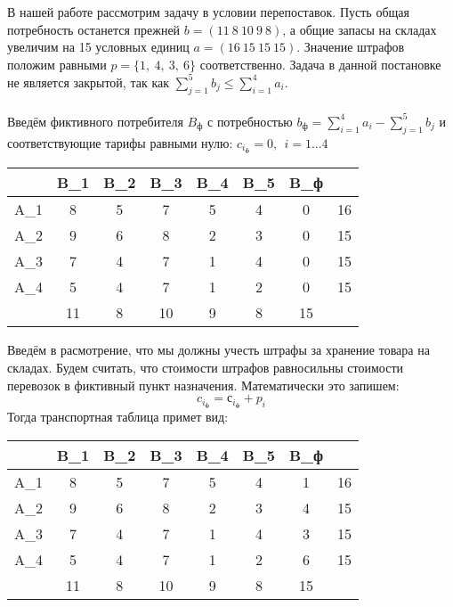 \documentclass{article}
\begin{document}
\noindent В нашей работе рассмотрим задачу в условии перепоставок. Пусть общая потребность останется прежней $b = (11~8~10~9~8)$,  а общие запасы на складах увеличим на 15 условных единиц $a = (16~15~15~15)$. Значение штрафов положим равными $p = \{1,~4,~3,~6\}$ соответственно.
Задача в данной постановке не является закрытой, так как $\displaystyle\sum_{j=1}^{5} b_{j}  \le \displaystyle\sum_{i=1}^{4} a_{i}$.
\\\\
Введём фиктивного потребителя $B_ф$ с потребностью $b_ф= \sum_{i=1}^{4} a_{i}-\sum_{j=1}^{5} b_{j}$ и соответствующие тарифы равными нулю: $c_i_ф=0,~~i=1...4$
\begin{table}[H]
    \centering
    \begin{tabular}{|c|c|c|c|c|c|c| |c|}
    \hline
        &\cellcolor{myGren} B_1 & \cellcolor{myGren}B_2 & \cellcolor{myGren}B_3 & \cellcolor{myGren}B_4 & \cellcolor{myGren} B_5 & \cellcolor{myGren} B_ф &  \\ \hline
       \cellcolor{myGren} A_1 & 8 & 5 & 7 & 5 & 4 & 0 & 16\\ \hline
       \cellcolor{myGren} A_2 & 9 & 6 & 8 & 2 & 3 & 0 & 15\\  \hline
       \cellcolor{myGren} A_3 & 7 & 4 & 7 & 1 & 4 & 0 & 15\\ \hline
       \cellcolor{myGren} A_4 & 5 & 4 & 7 & 1 & 2 & 0& 15\\ \hline\hline
            & 11 & 8 & 10 & 9 & 8 & 15 & \\
            \hline
    \end{tabular}
 \end{table}
 
\noindent Введём в расмотрение, что мы должны учесть штрафы за хранение товара на складах. Будем считать, что стоимости штрафов равносильны стоимости перевозок в фиктивный пункт назначения.
Математически это запишем: 
$$c_i_ф = с_i_ф + p_i$$
Тогда транспортная таблица примет вид: 
\begin{table}[H]
    \centering
    \begin{tabular}{|c|c|c|c|c|c|c| |c|}
    \hline
        &\cellcolor{myGren} B_1 & \cellcolor{myGren}B_2 & \cellcolor{myGren}B_3 & \cellcolor{myGren}B_4 & \cellcolor{myGren} B_5 & \cellcolor{myGren} B_ф &  \\ \hline
       \cellcolor{myGren} A_1 & 8 & 5 & 7 & 5 & 4 & 1 & 16\\ \hline
       \cellcolor{myGren} A_2 & 9 & 6 & 8 & 2 & 3 & 4 & 15\\  \hline
       \cellcolor{myGren} A_3 & 7 & 4 & 7 & 1 & 4 & 3 & 15\\ \hline
       \cellcolor{myGren} A_4 & 5 & 4 & 7 & 1 & 2 & 6& 15\\ \hline\hline
            & 11 & 8 & 10 & 9 & 8 & 15 & \\
            \hline
    \end{tabular}
 \end{table}
\end{document}
